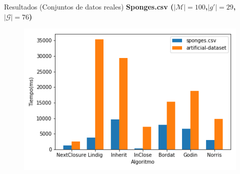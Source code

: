 \documentclass{beamer}
\newcommand{\M}{\mathcal{M}}
\newcommand{\G}{\mathcal{G}}
\begin{document}
    \begin{frame}{Resultados (Conjuntos de datos reales)}
      \textbf{Sponges.csv ($|\M|=100$,$|g'|=29$,$|\G|=76$) }
      \begin{figure}[H]
      \centering
      \includegraphics[scale=0.6]{images/comparative-sponges.png}
        \end{figure}
    \end{frame}
    
\end{document}
